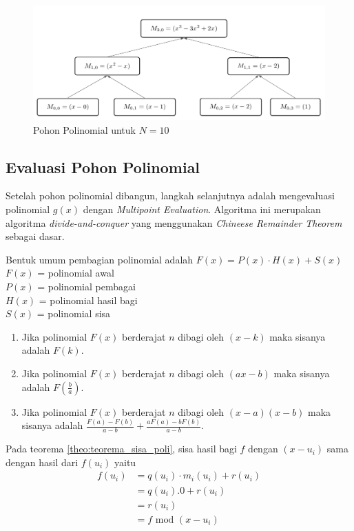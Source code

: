 \begin{figure}
	\Centering
	\includegraphics [scale=0.25]{bab2/img/pohon-polinomial-n-10}
	\caption {Pohon Polinomial untuk $ N  = 10 $}
	\label {fig:pohon-polinomial-n-10}
\end{figure}

\subsection{Evaluasi Pohon Polinomial}
\label{sec:evaluasi_pohon_polinomial}
Setelah pohon polinomial dibangun, langkah selanjutnya adalah mengevaluasi polinomial $ g(x) $ dengan \textit{Multipoint Evaluation}. Algoritma ini merupakan algoritma \textit{divide-and-conquer} yang menggunakan \textit{Chineese Remainder Theorem} sebagai dasar.
\begin{theo}
	\label{theo:teorema_sisa_poli}
	Bentuk umum pembagian polinomial adalah $ F(x) = P(x) \cdot H(x) + S(x) $ \\
	$ F(x) $ = polinomial awal \\
	$ P(x) $ = polinomial pembagai \\
	$ H(x) $ = polinomial hasil bagi \\
	$ S(x) $ = polinomial sisa \\
	\begin{enumerate}
		\item Jika polinomial $ F(x) $ berderajat $ n $ dibagi oleh $ (x - k) $ maka sisanya adalah $ F(k) $.
		\item Jika polinomial $ F(x) $ berderajat $ n $ dibagi oleh $ (ax - b) $ maka sisanya adalah $ F(\frac{b}{a}) $.
		\item Jika polinomial $ F(x) $ berderajat $ n $ dibagi oleh $ (x - a)(x - b) $ maka sisanya adalah $ \frac{F(a) - F(b)}{a - b} +  \frac{aF(a) - bF(b)}{a - b}$.
	\end{enumerate}
\end{theo}
Pada teorema \ref{theo:teorema_sisa_poli}, sisa hasil bagi $ f $ dengan $ (x - u_i ) $ sama dengan hasil dari $ f(u_i) $ yaitu 
\begin{equation}
	\begin{aligned}
		f(u_i) &= q(u_i) \cdot m_i(u_i) + r(u_i) \\
			   &= q(u_i).0 + r(u_i) \\
			   &= r(u_i) \\
			   &= f \text{ mod } (x - u_i)
	\end{aligned}
	\label{eq:f_mod_ui}
\end{equation}

